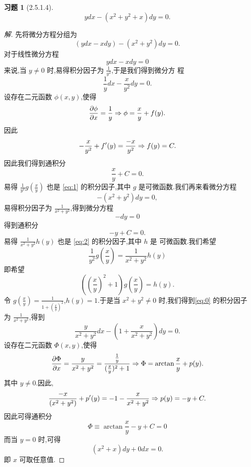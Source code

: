\documentclass[a4paper, 12pt]{article} %
\newtheorem*{cdtheorem}{习题}
\newenvironment{exercise}
{\bigskip\begin{mdframed}[backgroundcolor=gray!40,rightline=false,leftline=false,topline=false,bottomline=false]\begin{cdtheorem}}
    {\end{cdtheorem}\end{mdframed}\bigskip}
\begin{document}
\begin{exercise}[2.5.1.4]
  \begin{equation}
    \label{eq:0}
    ydx-(x^2+y^2+x)dy=0.
  \end{equation}
\end{exercise}
\begin{proof}[解]
先将微分方程分组为
$$
(ydx-xdy)-(x^2+y^2)dy=0.
$$
对于线性微分方程
\begin{equation}
  \label{eq:1}
  ydx-xdy=0
\end{equation}
来说,当 $y\neq 0$ 时,易得积分因子为 $\frac{1}{y^2}$,于是我们得到微分方
程
$$
\frac{1}{y}dx-\frac{x}{y^2}dy=0.
$$
设存在二元函数 $\phi(x,y)$,使得
$$
\frac{\partial\phi}{\partial x}=\frac{1}{y}\Rightarrow \phi=\frac{x}{y}+f(y).
$$
因此
$$
-\frac{x}{y^2}+f'(y)=\frac{-x}{y^2}\Rightarrow f(y)=C.
$$
因此我们得到通积分
$$
\frac{x}{y}+C=0.
$$
易得 $\frac{1}{y^2}g(\frac{x}{y})$ 也是 \eqref{eq:1} 的积分因子,其中
$g$ 是可微函数.我们再来看微分方程
\begin{equation}
  \label{eq:2}
  -(x^2+y^2)dy=0,
\end{equation}
易得积分因子为 $\frac{1}{x^2+y^2}$,得到微分方程
$$
-dy=0
$$
得到通积分
$$
-y+C=0.
$$
易得 $\frac{1}{x^2+y^2}h(y)$ 也是 \eqref{eq:2} 的积分因子,其中 $h$ 是
可微函数.我们希望
$$
\frac{1}{y^2}g(\frac{x}{y})=\frac{1}{x^2+y^2}h(y)
$$
即希望
$$
((\frac{x}{y})^2+1)g(\frac{x}{y})=h(y).
$$
令 $g(\frac{x}{y})=\frac{1}{1+(\frac{x}{y})^2}$,$h(y)=1$.于是当
$x^2+y^2\neq 0$ 时,我们得到\eqref{eq:0} 的积分因子为 $\frac{1}{x^2+y^2}$,得到
\begin{equation}
  \label{eq:4}
  \frac{y}{x^2+y^2}dx-(1+\frac{x}{x^2+y^2})dy=0.
\end{equation}
设存在二元函数 $\Phi(x,y)$,使得
$$
\frac{\partial \Phi}{\partial
  x}=\frac{y}{x^2+y^2}=\frac{\frac{1}{y}}{(\frac{x}{y})^2+1}\Rightarrow
\Phi=\arctan \frac{x}{y}+p(y).
$$
其中 $y\neq 0$.因此,
$$
\frac{-x}{(x^2+y^2)}+p'(y)=-1-\frac{x}{x^2+y^2}\Rightarrow p(y)=-y+C.
$$
因此可得通积分
$$
\Phi\equiv \arctan \frac{x}{y}-y+C=0
$$
而当 $y=0$ 时,可得
$$
(x^2+x)dy+0dx=0.
$$
即 $x$ 可取任意值.
\begin{comment}
先将微分方程分组为
$$
(ydx-xdy)-(x^2+y^2)dy=0.
$$
对于微分方程
\begin{equation}
  \label{eq:1}
  ydx-xdy=0
\end{equation}
来说,易得积分因子为 $\frac{1}{xy}$,得到微分方程
\begin{equation}

\end{comment}
\end{proof}
\end{document}
